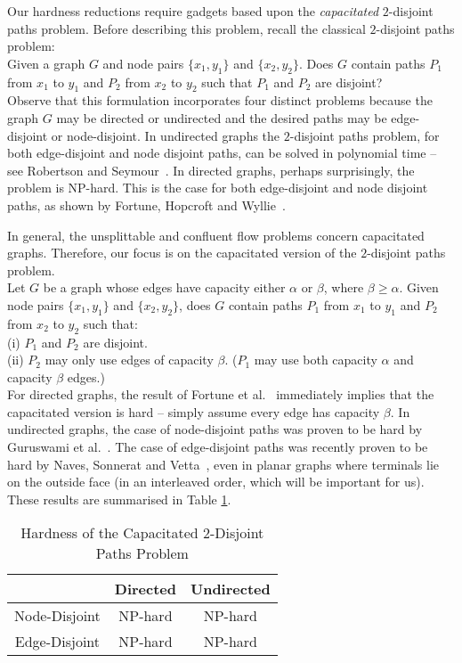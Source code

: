 \documentclass[12pt]{article}
\def\a{\alpha}
\def\b{\beta}
\begin{document}
Our hardness reductions require gadgets based upon the {\em capacitated} $2$-disjoint paths problem.
Before describing this problem, recall the classical $2$-disjoint paths problem:\\

 Given a graph $G$ and node pairs $\{x_1, y_1\}$
and $\{x_2, y_2\}$. Does $G$ contain paths $P_1$ from $x_1$ to $y_1$
and $P_2$ from $x_2$ to $y_2$ such that $P_1$ and $P_2$ are disjoint?\\

Observe that this formulation incorporates four distinct problems
because the graph $G$ may be directed or undirected and the desired paths
may be edge-disjoint or node-disjoint.
In undirected graphs the $2$-disjoint paths problem, for both edge-disjoint and node disjoint paths,
can be solved in polynomial time
-- see  Robertson and Seymour~\cite{RS95}.
In directed graphs, perhaps surprisingly, the problem is NP-hard. This is the
case for both edge-disjoint and node disjoint paths, as shown
by  Fortune, Hopcroft and Wyllie~\cite{FHW80}.

In general, the unsplittable and confluent flow problems concern capacitated graphs.
Therefore, our focus is on the capacitated version of the $2$-disjoint paths problem. \\


 Let $G$ be a graph whose edges have
capacity either $\a$ or $\b$, where $\b \ge \a$.
Given node pairs $\{x_1, y_1\}$
and $\{x_2, y_2\}$, does $G$ contain paths $P_1$ from $x_1$ to $y_1$
and $P_2$ from $x_2$ to $y_2$ such that:\\
(i) $P_1$ and $P_2$ are disjoint.\\
(ii) $P_2$ may only use edges of capacity $\b$. ($P_1$
may use both capacity $\a$ and capacity $\b$ edges.) \\


For directed graphs, the result of Fortune et al.~\cite{FHW80} immediately implies that the capacitated version is
hard -- simply assume every edge has capacity $\beta$. In undirected graphs, the case of node-disjoint paths
was proven to be hard by Guruswami et al.~\cite{guruswami2003near}. The case of edge-disjoint paths was recently
proven to be hard by Naves, Sonnerat and Vetta~\cite{naves2010maximum}, even in
planar graphs where terminals lie on the outside face (in an interleaved order, which will be important for us). These results are summarised in Table \ref{table:hardness}.
\begin{table}[h]
      \centering
          \begin{tabular}{|c|cc|}
          \hline
& Directed & Undirected \\
\hline
Node-Disjoint  &    NP-hard \cite{FHW80} & NP-hard \cite{guruswami2003near} \\
Edge-Disjoint  & NP-hard \cite{FHW80} & NP-hard  \cite{naves2010maximum} \\
\hline
   \end{tabular}
\caption{Hardness of the Capacitated 2-Disjoint Paths Problem}\label{table:hardness}
\end{table}
\end{document}
